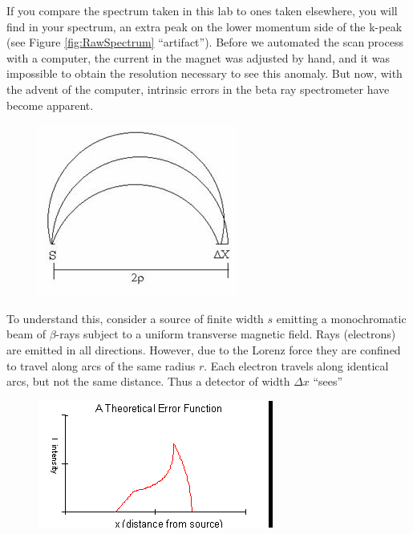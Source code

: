 \documentclass{../lab}
\begin{document}
If you compare the spectrum taken in this lab to ones taken elsewhere, you will find in your spectrum, an extra peak on the lower momentum side of the k-peak (see Figure \ref{fig:RawSpectrum} ``artifact''). Before we automated the scan process with a computer, the current in the magnet was adjusted by hand, and it was impossible to obtain the resolution necessary to see this anomaly. But now, with the advent of the computer, intrinsic errors in the beta ray spectrometer have become apparent.

\begin{figure}[h]
    \centering
    \href{http://experimentationlab.berkeley.edu/sites/default/files/images/BRAimage039.jpg}{\includegraphics[width=0.5\linewidth]{images/BRAimage039.jpg}}
    \caption{}
    \label{fig:BRAimage039}
\end{figure}

To understand this, consider a source of finite width $s$ emitting a monochromatic beam of $\beta$-rays subject to a uniform transverse magnetic field. Rays (electrons) are emitted in all directions. However, due to the Lorenz force they are confined to travel along arcs of the same radius $r$. Each electron travels along identical arcs, but not the same distance. Thus a detector of width $\Delta x$ ``sees''

\begin{figure}[h]
    \centering
    \href{http://experimentationlab.berkeley.edu/sites/default/files/images/BRAimage040.gif}{\includegraphics[width=0.5\linewidth]{images/BRAimage040.png}}
    \caption{}
    \label{fig:TheoreticalErrorFunction}
\end{figure}
\end{document}
